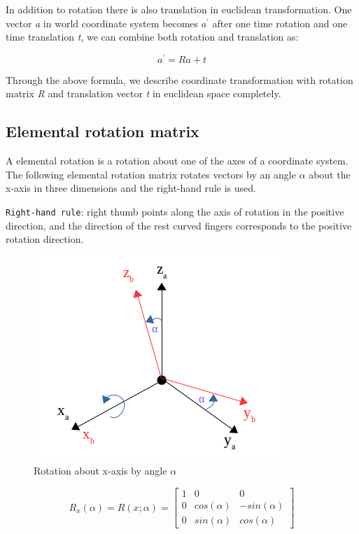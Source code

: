 In addition to rotation there is also translation in euclidean transformation. One vector \textit{a} in world coordinate system becomes \textit{$a^{\prime}$} after one time rotation and one time translation \textit{t}, we can combine both rotation and translation as:

\begin{equation*}
a^{\prime} = Ra + t
\end{equation*}

Through the above formula, we describe coordinate transformation with rotation matrix \textit{R} and translation vector \textit{t} in euclidean space completely. 


\subsection{Elemental rotation matrix}
A elemental rotation is a rotation about one of the axes of a coordinate system. The following elemental rotation matrix rotates vectors by an angle $\alpha$ about the x-axis in three dimensions and the right-hand rule is used.

\texttt{Right-hand rule}: right thumb points along the axis of rotation in the positive direction, and the direction of the rest curved fingers corresponds to the positive rotation direction.

\begin{figure}[h]
\centering
\includegraphics[scale=0.5]{./fig/rotationx.png}
\caption{Rotation about x-axis by angle $\alpha$}
\label{fig:rotationx}
\end{figure}

\begin{equation*}
R_x(\alpha) = R(x;\alpha)
      = \begin{bmatrix} 1 & 0 & 0\\
                        0 & cos(\alpha) & -sin(\alpha)\\
                        0 & sin(\alpha) & cos(\alpha) \end{bmatrix}                
\end{equation*}

